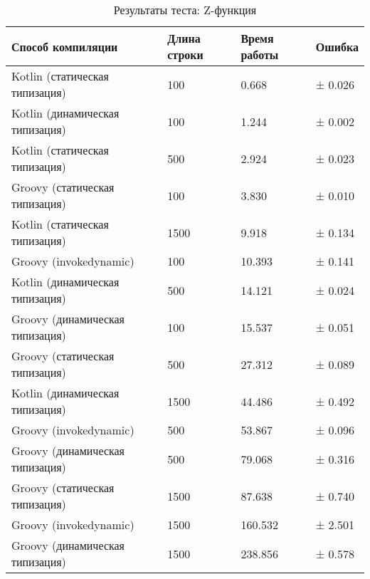 \begin{table}[h]
\caption{\label{tab:zFunctionBenchResults}Результаты теста: Z-функция}
\begin{center}
\begin{tabular}{|l|l|l|l|}
\hline
Способ компиляции & Длина строки	& Время работы & Ошибка \\
\hline
Kotlin (статическая типизация)              &  100  &   0.668 & ± 0.026 \\
Kotlin (динамическая типизация)             &  100  &   1.244 & ± 0.002 \\
Kotlin (статическая типизация)              &  500  &   2.924 & ± 0.023 \\
Groovy (статическая типизация)              &  100  &   3.830 & ± 0.010 \\
Kotlin (статическая типизация)              & 1500  &   9.918 & ± 0.134 \\
Groovy (invokedynamic)                      &  100  &  10.393 & ± 0.141 \\
Kotlin (динамическая типизация)             &  500  &  14.121 & ± 0.024 \\
Groovy (динамическая типизация)             &  100  &  15.537 & ± 0.051 \\
Groovy (статическая типизация)              &  500  &  27.312 & ± 0.089 \\
Kotlin (динамическая типизация)             & 1500  &  44.486 & ± 0.492 \\
Groovy (invokedynamic)                      &  500  &  53.867 & ± 0.096 \\
Groovy (динамическая типизация)             &  500  &  79.068 & ± 0.316 \\
Groovy (статическая типизация)              & 1500  &  87.638 & ± 0.740 \\
Groovy (invokedynamic)                      & 1500  & 160.532 & ± 2.501 \\
Groovy (динамическая типизация)             & 1500  & 238.856 & ± 0.578 \\
\hline
\end{tabular}
\end{center}
\end{table} 


